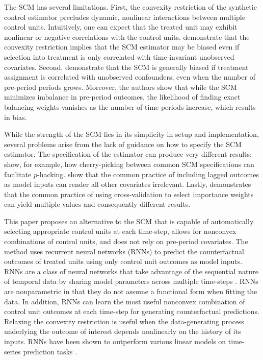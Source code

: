 \documentclass[hidelinks,12pt]{article}
\begin{document}
The SCM has several limitations. First, the convexity restriction of the synthetic control estimator precludes dynamic, nonlinear interactions between multiple control units. Intuitively, one can expect that the treated unit may exhibit nonlinear or negative correlations with the control units. \citet{ferman2016revisiting} demonstrate that the convexity restriction implies that the SCM estimator may be biased even if selection into treatment is only correlated with time-invariant unobserved covariates. Second, \citet{ferman2018synthetic} demonstrate that the SCM is generally biased if treatment assignment is correlated with unobserved confounders, even when the number of pre-period periods grows. Moreover, the authors show that while the SCM minimizes imbalance in pre-period outcomes, the likelihood of finding exact balancing weights vanishes as the number of time periods increase, which results in bias. 

While the strength of the SCM lies in its simplicity in setup and implementation, several problems arise from the lack of guidance on how to specify the SCM estimator. The specification of the estimator can produce very different results: \citet{ferman2018cherry} show, for example, how cherry-picking between common SCM specifications can facilitate $p$-hacking. \citet{kaul2015synthetic} show that the common practice of including lagged outcomes as model inputs can render all other covariates irrelevant. Lastly, \citet{klossner2017comparative} demonstrates that the common practice of using cross-validation to select importance weights can yield multiple values and consequently different results. 

This paper proposes an alternative to the SCM that is capable of automatically selecting appropriate control units at each time-step, allows for nonconvex combinations of control units, and does not rely on pre-period covariates. The method uses recurrent neural networks (RNNs) to predict the counterfactual outcomes of treated units using only control unit outcomes as model inputs. RNNs are a class of neural networks that take advantage of the sequential nature of temporal data by sharing model parameters across multiple time-steps \citep{el1995}. RNNs are nonparametric in that they do not assume a functional form when fitting the data. In addition, RNNs can learn the most useful nonconvex combination of control unit outcomes at each time-step for generating counterfactual predictions. Relaxing the convexity restriction is useful when the data-generating process underlying the outcome of interest depends nonlinearly on the history of its inputs. RNNs have been shown to outperform various linear models on time-series prediction tasks \citep{cinar2017position}. 
\end{document}
